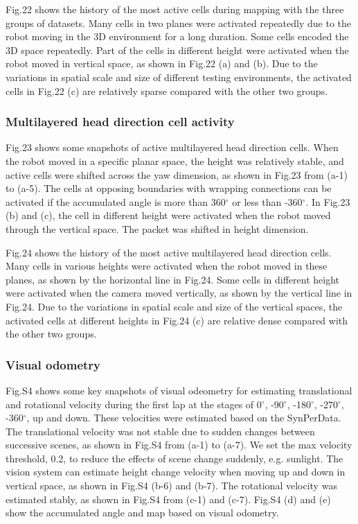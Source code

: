 Fig.22 shows the history of the most active cells during mapping with the three groups of datasets.
Many cells in two planes were activated repeatedly due to the robot moving in the 3D environment for a long duration.
Some cells encoded the 3D space repeatedly.
Part of the cells in different height were activated when the robot moved in vertical space, as shown in Fig.22 (a) and (b).
Due to the variations in spatial scale and size of different testing environments, the activated cells in Fig.22 (c) are relatively sparse compared with the other two groups.



\subsubsection{Multilayered head direction cell activity}

Fig.23 shows some snapshots of active multilayered head direction cells.
When the robot moved in a specific planar space, the height was relatively stable, and active cells were shifted across the yaw dimension, as shown in Fig.23 from (a-1) to (a-5).
The cells at opposing boundaries with wrapping connections can be activated if the accumulated angle is more than 360$^\circ$ or less than -360$ ^\circ $.
In Fig.23 (b) and (c), the cell in different height were activated when the robot moved through the vertical space.
The packet was shifted in height dimension.


Fig.24 shows the history of the most active multilayered head direction cells.
Many cells in  various heights were activated when the robot moved in these planes, as shown by the horizontal line in Fig.24.
Some cells in different height were activated when the camera moved vertically, as shown by the vertical line in Fig.24.
Due to the variations in spatial scale and size of the vertical spaces, the activated cells at different heights in Fig.24 (c) are relative dense compared with the other two groups.


\subsubsection{Visual odometry}

Fig.S4 shows some key snapshots of visual odeometry for estimating translational and rotational velocity during the first lap at the stages of 0$ ^\circ $, -90$ ^\circ $, -180$ ^\circ $, -270$ ^\circ $, -360$ ^\circ $, up and down.
These velocities were estimated based on the SynPerData.
The translational velocity was not stable due to sudden changes between successive scenes, as shown in Fig.S4 from (a-1) to (a-7).
We set the max velocity threshold, 0.2, to reduce the effects of scene change suddenly, e.g. sunlight.
The vision system can estimate height change velocity when moving up and down in vertical space, as shown in Fig.S4 (b-6) and (b-7).
The rotational velocity was estimated stably, as shown in Fig.S4 from (c-1) and (c-7).
Fig.S4 (d) and (e) show the accumulated angle and map based on visual odometry.








